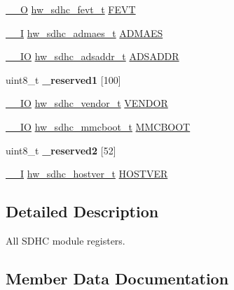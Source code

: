 \begin{DoxyCompactItemize}
\item 
\hyperlink{core__sc300_8h_a7e25d9380f9ef903923964322e71f2f6}{\+\_\+\+\_\+O} \hyperlink{union__hw__sdhc__fevt}{hw\+\_\+sdhc\+\_\+fevt\+\_\+t} \hyperlink{struct__hw__sdhc_a026ea6c486e4a3e715b8d56fbbbc3a08}{F\+E\+VT}
\item 
\hyperlink{core__sc300_8h_af63697ed9952cc71e1225efe205f6cd3}{\+\_\+\+\_\+I} \hyperlink{union__hw__sdhc__admaes}{hw\+\_\+sdhc\+\_\+admaes\+\_\+t} \hyperlink{struct__hw__sdhc_a53ece25f59f4380795f27a97aac707f0}{A\+D\+M\+A\+ES}
\item 
\hyperlink{core__sc300_8h_aec43007d9998a0a0e01faede4133d6be}{\+\_\+\+\_\+\+IO} \hyperlink{union__hw__sdhc__adsaddr}{hw\+\_\+sdhc\+\_\+adsaddr\+\_\+t} \hyperlink{struct__hw__sdhc_aa3d3330b7da5506977f65a5b2f8e8049}{A\+D\+S\+A\+D\+DR}
\item 
uint8\+\_\+t {\bfseries \+\_\+reserved1} \mbox{[}100\mbox{]}\hypertarget{struct__hw__sdhc_a72d3aa21ffaa2132937d829c189c259e}{}\label{struct__hw__sdhc_a72d3aa21ffaa2132937d829c189c259e}

\item 
\hyperlink{core__sc300_8h_aec43007d9998a0a0e01faede4133d6be}{\+\_\+\+\_\+\+IO} \hyperlink{union__hw__sdhc__vendor}{hw\+\_\+sdhc\+\_\+vendor\+\_\+t} \hyperlink{struct__hw__sdhc_a22a9db48eddef86d2ea97a226b8b8c1c}{V\+E\+N\+D\+OR}
\item 
\hyperlink{core__sc300_8h_aec43007d9998a0a0e01faede4133d6be}{\+\_\+\+\_\+\+IO} \hyperlink{union__hw__sdhc__mmcboot}{hw\+\_\+sdhc\+\_\+mmcboot\+\_\+t} \hyperlink{struct__hw__sdhc_a4fee222eba57b75453e67aa328f6546f}{M\+M\+C\+B\+O\+OT}
\item 
uint8\+\_\+t {\bfseries \+\_\+reserved2} \mbox{[}52\mbox{]}\hypertarget{struct__hw__sdhc_a96bd5b5afc92871a9a7a33a79afe1c28}{}\label{struct__hw__sdhc_a96bd5b5afc92871a9a7a33a79afe1c28}

\item 
\hyperlink{core__sc300_8h_af63697ed9952cc71e1225efe205f6cd3}{\+\_\+\+\_\+I} \hyperlink{union__hw__sdhc__hostver}{hw\+\_\+sdhc\+\_\+hostver\+\_\+t} \hyperlink{struct__hw__sdhc_a558556e8b8d2769da067d0dd6e6808a5}{H\+O\+S\+T\+V\+ER}
\end{DoxyCompactItemize}


\subsection{Detailed Description}
All S\+D\+HC module registers. 

\subsection{Member Data Documentation}
